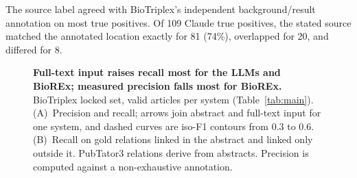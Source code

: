\documentclass[preprint,10pt,letterpaper]{elsarticle}
\begin{document}
The source label agreed with BioTriplex's independent background/result annotation on most true positives. Of 109 Claude true positives, the stated source matched the annotated location exactly for 81 (74\%), overlapped for 20, and differed for 8.

\begin{figure}[!htbp]
\centering
\resizebox{\linewidth}{!}{}
\caption{\textbf{Full-text input raises recall most for the LLMs and BioREx; measured precision falls most for BioREx.} BioTriplex locked set, valid articles per system (Table~\ref{tab:main}). (A)~Precision and recall; arrows join abstract and full-text input for one system, and dashed curves are iso-F1 contours from 0.3 to 0.6. (B)~Recall on gold relations linked in the abstract and linked only outside it. PubTator3 relations derive from abstracts. Precision is computed against a non-exhaustive annotation.}
\label{fig:pr}
\end{figure}
\end{document}
